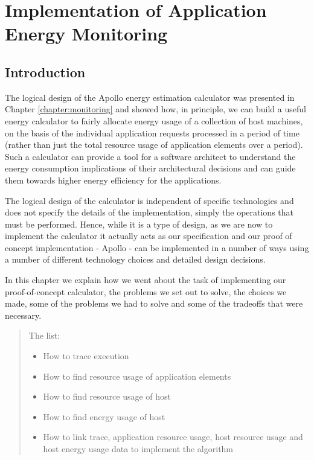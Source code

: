 \chapter{Implementation of Application Energy Monitoring}
\label{chapter:implementation}

\section{Introduction}
The logical design of the Apollo energy estimation calculator was presented in Chapter \ref{chapter:monitoring} and showed how, in principle, we can build a useful energy calculator to fairly allocate energy usage of a collection of host machines, on the basis of the individual application requests processed in a period of time (rather than just the total resource usage of application elements over a period).   Such a calculator can provide a tool for a software architect to understand the energy consumption implications of their architectural decisions and can guide them towards higher energy efficiency for the applications.

The logical design of the calculator is independent of specific technologies and does not specify the details of the implementation, simply the operations that must be performed.  Hence, while it is a type of design, as we are now to implement the calculator it actually acts as our specification and our proof of concept implementation - Apollo - can be implemented in a number of ways using a number of different technology choices and detailed design decisions.

In this chapter we explain how we went about the task of implementing our proof-of-concept calculator, the problems we set out to solve, the choices we made, some of the problems we had to solve and some of the tradeoffs that were necessary.

\begin{quote}

The list:
\begin{itemize}
	\item How to trace execution
	\item How to find resource usage of application elements
	\item How to find resource usage of host
	\item How to find energy usage of host
	\item How to link trace, application resource usage, host resource usage and host energy usage data to implement the algorithm
\end{itemize}
\end{quote}

